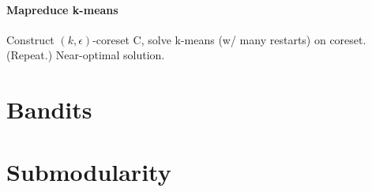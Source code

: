 \documentclass[9pt]{scrartcl}
\newcommand{\eps}{\epsilon}
\begin{document}
\begin{twocolumn}
\paragraph{Mapreduce k-means} Construct $(k,\eps)$-coreset C, solve k-means (w/ many restarts) on coreset. (Repeat.) Near-optimal solution.

\section{Bandits}

\section{Submodularity}

\end{twocolumn}

\appendix
\end{document}
